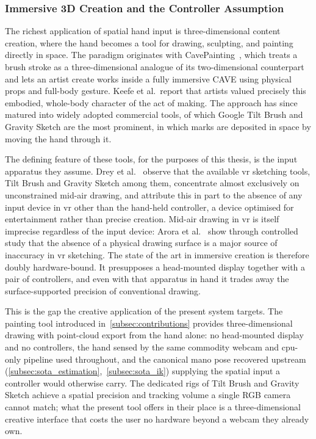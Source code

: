 \subsubsection{Immersive 3D Creation and the Controller Assumption}\label{subsubsec:sota_creative}

The richest application of spatial hand input is three-dimensional content
creation, where the hand becomes a tool for drawing, sculpting, and painting
directly in space.
The paradigm originates with CavePainting~\cite{keefe2001cavepainting}, which
treats a brush stroke as a three-dimensional analogue of its
two-dimensional counterpart and lets an artist create works inside a fully
immersive CAVE using physical props and full-body gesture.
Keefe et al.\ report that artists valued precisely this embodied, whole-body
character of the act of making.
The approach has since matured into widely adopted commercial tools, of which
Google Tilt Brush and Gravity Sketch are the most prominent, in which marks are
deposited in space by moving the hand through it.

The defining feature of these tools, for the purposes of this thesis, is the
input apparatus they assume.
Drey et al.~\cite{drey2020vrsketchin} observe that the available
\acrshort{vr} sketching tools, Tilt Brush and Gravity Sketch among them,
concentrate almost exclusively on unconstrained mid-air drawing, and attribute
this in part to the absence of any input device in \acrshort{vr} other
than the hand-held controller, a device optimised for entertainment rather than
precise creation.
Mid-air drawing in \acrshort{vr} is itself imprecise regardless of the input device:
Arora et al.~\cite{arora2017sketching} show through controlled study
that the absence of a physical drawing surface is a major source of inaccuracy
in \acrshort{vr} sketching.
The state of the art in immersive creation is therefore doubly hardware-bound.
It presupposes a head-mounted display together with a pair of controllers, and
even with that apparatus in hand it trades away the surface-supported precision
of conventional drawing.

This is the gap the creative application of the present system targets.
The painting tool introduced in~\autoref{subsec:contributions} provides
three-dimensional drawing with point-cloud export from the hand alone: no
head-mounted display and no controllers, the hand sensed by the same commodity
webcam and \acrshort{cpu}-only pipeline used throughout, and the canonical
\acrshort{mano} pose recovered upstream
(\autoref{subsec:sota_estimation},~\autoref{subsec:sota_ik}) supplying the
spatial input a controller would otherwise carry.
The dedicated rigs of Tilt Brush and Gravity Sketch achieve a spatial precision
and tracking volume a single RGB camera cannot match; what the present tool
offers in their place is a three-dimensional creative interface that costs the
user no hardware beyond a webcam they already own.
